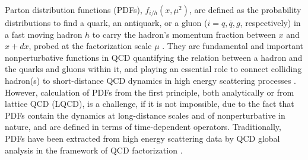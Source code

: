 \documentclass[twocolumn,aps,prd,superscriptaddress,nofootinbib,showpacs]{revtex4}
\begin{document}
Parton distribution functions (PDFs), $f_{i/h}(x,\mu^2)$, are defined as the probability distributions to find a quark, an antiquark, or a gluon ($i=q,\bar{q},g$, respectively) in a fast moving hadron $h$ to carry the hadron's momentum fraction between $x$ and $x+dx$,
probed at the factorization scale $\mu$ \cite{Collins:1989gx}. They are fundamental and important nonperturbative functions in QCD quantifying the relation between a hadron and the quarks and gluons within it, and playing an essential role to connect colliding hadron(s) to short-distance QCD dynamics in high energy scattering processes \cite{Brambilla:2014jmp}. However, calculation of PDFs from the first principle, both analytically or from lattice QCD (LQCD), is a challenge, if it is not impossible, due to the fact that PDFs contain the dynamics at long-distance scales and of nonperturbative in nature, and are defined in terms of time-dependent operators.  Traditionally, PDFs have been extracted from high energy scattering data by QCD global analysis in the framework of QCD factorization \cite{Dulat:2015mca,Martin:2009iq,Ball:2014uwa,Alekhin:2013nda,Ethier:2017zbq}.
\end{document}
